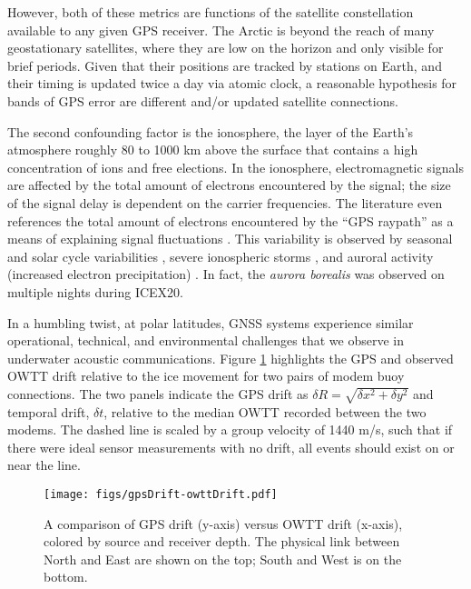 However, both of these metrics are functions of the satellite constellation available to any given GPS receiver.
The Arctic is beyond the reach of many geostationary satellites, where they are low on the horizon and only visible for brief periods.
Given that their positions are tracked by stations on Earth, and their timing is updated twice a day via atomic clock, a reasonable hypothesis for bands of GPS error are different and/or updated satellite connections.

The second confounding factor is the ionosphere, the layer of the Earth's atmosphere roughly 80 to 1000 km above the surface that contains a high concentration of ions and free elections. 
In the ionosphere, electromagnetic signals are affected by the total amount of electrons encountered by the signal; the size of the signal delay is dependent on the carrier frequencies.
The literature even references the total amount of electrons encountered by the ``GPS raypath'' as a means of explaining signal fluctuations \citep{themens_nature_2015}.
This variability is observed by seasonal and solar cycle variabilities \citep{themens_nature_2015}, severe ionospheric storms \citep{mitchell_gps_2005}, and auroral activity (increased electron precipitation) \citep{jin_gps_2014,gwal_gps_2011}.
In fact, the \textit{aurora borealis} was observed on multiple nights during ICEX20.

In a humbling twist, at polar latitudes, GNSS systems experience similar operational, technical, and environmental challenges that we observe in underwater acoustic communications.
Figure \ref{fig:gps-drift-example} highlights the GPS and observed OWTT drift relative to the ice movement for two pairs of modem buoy connections.
The two panels indicate the GPS drift as $\delta R = \sqrt{\delta x^2 + \delta y^2}$ and temporal drift, $\delta t$, relative to the median OWTT recorded between the two modems.
The dashed line is scaled by a group velocity of 1440 m/s, such that if there were ideal sensor measurements with no drift, all events should exist on or near the line.

\begin{figure}[h!]
	\centering
	\texttt{[image: figs/gpsDrift-owttDrift.pdf]} 
	\caption{A comparison of GPS drift (y-axis) versus OWTT drift (x-axis), colored by source and receiver depth. The physical link between North and East are shown on the top; South and West is on the bottom.}
	\label{fig:gps-drift-example}
\end{figure}

